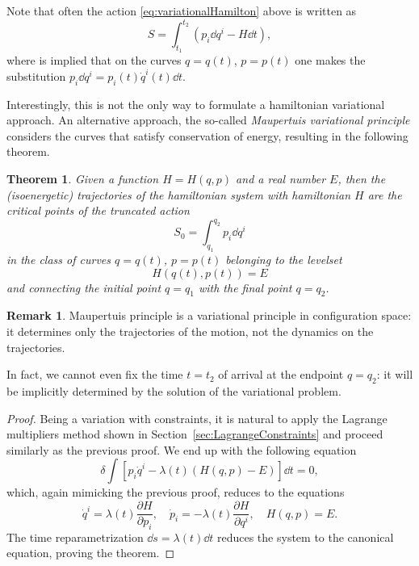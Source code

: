 \documentclass[english,fontsize=11pt,paper=b5]{scrbook}
\newtheorem{theorem}{Theorem}[chapter]
\theoremstyle{definition}
\newtheorem{remark}{Remark}[chapter]
\begin{document}
    Note that often the action \eqref{eq:variationalHamilton} above is written as
    \begin{equation}
      S = \int_{t_1}^{t_2} (p_i \dd q^i - H \dd t),
    \end{equation}
    where is implied that on the curves $q=q(t)$, $p=p(t)$ one makes the substitution $p_i \dd q^i = p_i(t) \dot q^i (t) \dd t$.

    Interestingly, this is not the only way to formulate a hamiltonian variational approach.
    An alternative approach, the so-called \emph{Maupertuis variational principle} considers the curves that satisfy conservation of energy, resulting in the following theorem.

    \begin{theorem}
      Given a function $H=H(q,p)$ and a real number $E$, then the (isoenergetic) \emph{trajectories} of the hamiltonian system with hamiltonian $H$ are the critical points of the truncated action
      \begin{equation}\label{eq:variationalMaupertuis}
        S_0 = \int_{q_1}^{q_2} p_i \dd q^i
      \end{equation}
      in the class of curves $q=q(t)$, $p=p(t)$ belonging to the levelset
      \begin{equation}
        H(q(t),p(t)) = E
      \end{equation}
      and connecting the initial point $q=q_1$ with the final point $q=q_2$.
    \end{theorem}

    \begin{remark}
      Maupertuis principle is a variational principle in configuration space: it determines only the trajectories of the motion, not the dynamics on the trajectories.

      In fact, we cannot even fix the time $t=t_2$ of arrival at the endpoint $q=q_2$: it will be implicitly determined by the solution of the variational problem.
    \end{remark}

    \begin{proof}
      Being a variation with constraints, it is natural to apply the Lagrange multipliers method shown in Section~\ref{sec:LagrangeConstraints} and proceed similarly as the previous proof. We end up with the following equation
      \begin{equation}
        \delta \int \left[p_i \dot q^i - \lambda(t)\left(H(q,p) - E\right)\right]\dd t = 0,
      \end{equation}
      which, again mimicking the previous proof, reduces to the equations
      \begin{equation}
        \dot q^i = \lambda(t) \frac{\partial H}{\partial p_i},
        \quad
        \dot p_i = -\lambda(t) \frac{\partial H}{\partial q^i},
        \quad H(q,p) = E.
      \end{equation}
      The time reparametrization $\dd s = \lambda(t)\dd t$ reduces the system to the canonical equation, proving the theorem.
    \end{proof}
\end{document}
